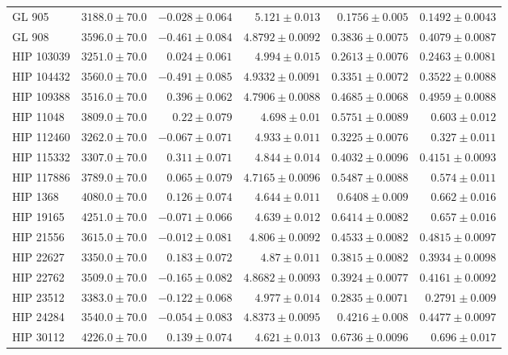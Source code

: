 \begin{longtable*}{lrrrrr}
GL 905 & $3188.0\pm 70.0$ & $-0.028\pm 0.064$ & $5.121\pm 0.013$ & $0.1756\pm 0.005$ & $0.1492\pm 0.0043$ \\ 
GL 908 & $3596.0\pm 70.0$ & $-0.461\pm 0.084$ & $4.8792\pm 0.0092$ & $0.3836\pm 0.0075$ & $0.4079\pm 0.0087$ \\ 
HIP 103039 & $3251.0\pm 70.0$ & $0.024\pm 0.061$ & $4.994\pm 0.015$ & $0.2613\pm 0.0076$ & $0.2463\pm 0.0081$ \\ 
HIP 104432 & $3560.0\pm 70.0$ & $-0.491\pm 0.085$ & $4.9332\pm 0.0091$ & $0.3351\pm 0.0072$ & $0.3522\pm 0.0088$ \\ 
HIP 109388 & $3516.0\pm 70.0$ & $0.396\pm 0.062$ & $4.7906\pm 0.0088$ & $0.4685\pm 0.0068$ & $0.4959\pm 0.0088$ \\ 
HIP 11048 & $3809.0\pm 70.0$ & $0.22\pm 0.079$ & $4.698\pm 0.01$ & $0.5751\pm 0.0089$ & $0.603\pm 0.012$ \\ 
HIP 112460 & $3262.0\pm 70.0$ & $-0.067\pm 0.071$ & $4.933\pm 0.011$ & $0.3225\pm 0.0076$ & $0.327\pm 0.011$ \\ 
HIP 115332 & $3307.0\pm 70.0$ & $0.311\pm 0.071$ & $4.844\pm 0.014$ & $0.4032\pm 0.0096$ & $0.4151\pm 0.0093$ \\ 
HIP 117886 & $3789.0\pm 70.0$ & $0.065\pm 0.079$ & $4.7165\pm 0.0096$ & $0.5487\pm 0.0088$ & $0.574\pm 0.011$ \\ 
HIP 1368 & $4080.0\pm 70.0$ & $0.126\pm 0.074$ & $4.644\pm 0.011$ & $0.6408\pm 0.009$ & $0.662\pm 0.016$ \\ 
HIP 19165 & $4251.0\pm 70.0$ & $-0.071\pm 0.066$ & $4.639\pm 0.012$ & $0.6414\pm 0.0082$ & $0.657\pm 0.016$ \\ 
HIP 21556 & $3615.0\pm 70.0$ & $-0.012\pm 0.081$ & $4.806\pm 0.0092$ & $0.4533\pm 0.0082$ & $0.4815\pm 0.0097$ \\ 
HIP 22627 & $3350.0\pm 70.0$ & $0.183\pm 0.072$ & $4.87\pm 0.011$ & $0.3815\pm 0.0082$ & $0.3934\pm 0.0098$ \\ 
HIP 22762 & $3509.0\pm 70.0$ & $-0.165\pm 0.082$ & $4.8682\pm 0.0093$ & $0.3924\pm 0.0077$ & $0.4161\pm 0.0092$ \\ 
HIP 23512 & $3383.0\pm 70.0$ & $-0.122\pm 0.068$ & $4.977\pm 0.014$ & $0.2835\pm 0.0071$ & $0.2791\pm 0.009$ \\ 
HIP 24284 & $3540.0\pm 70.0$ & $-0.054\pm 0.083$ & $4.8373\pm 0.0095$ & $0.4216\pm 0.008$ & $0.4477\pm 0.0097$ \\ 
HIP 30112 & $4226.0\pm 70.0$ & $0.139\pm 0.074$ & $4.621\pm 0.013$ & $0.6736\pm 0.0096$ & $0.696\pm 0.017$ \\ 

\end{longtable*}
